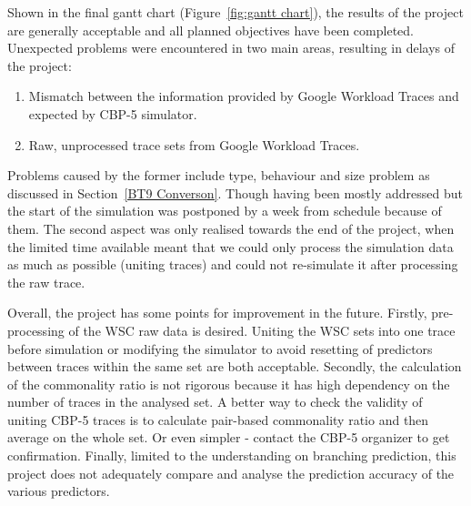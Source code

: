 Shown in the final gantt chart (Figure~\ref{fig:gantt chart}), the results of the project are generally acceptable and all planned objectives have been completed. Unexpected problems were encountered in two main areas, resulting in delays of the project:

\begin{enumerate}[itemsep= 0pt,topsep = 0pt, partopsep=4 pt, leftmargin= 32 pt]
\item Mismatch between the information provided by Google Workload Traces and expected by CBP-5 simulator.
\item Raw, unprocessed trace sets from Google Workload Traces.
\end{enumerate}

\hspace*{\fill}\par
Problems caused by the former include type, behaviour and size problem as discussed in Section~\ref{BT9 Converson}. Though having been mostly addressed but the start of the simulation was postponed by a week from schedule because of them. The second aspect was only realised towards the end of the project, when the limited time available meant that we could only process the simulation data as much as possible (uniting traces) and could not re-simulate it after processing the raw trace.\par\hspace*{\fill}\par

Overall, the project has some points for improvement in the future. Firstly, pre-processing of the WSC raw data is desired. Uniting the WSC sets into one trace before simulation or modifying the simulator to avoid resetting of predictors between traces within the same set are both acceptable. Secondly, the calculation of the commonality ratio is not rigorous because it has high dependency on the number of traces in the analysed set. A better way to check the validity of uniting CBP-5 traces is to calculate pair-based commonality ratio and then average on the whole set. Or even simpler - contact the CBP-5 organizer to get confirmation. Finally, limited to the understanding on branching prediction, this project does not adequately compare and analyse the prediction accuracy of the various predictors.
